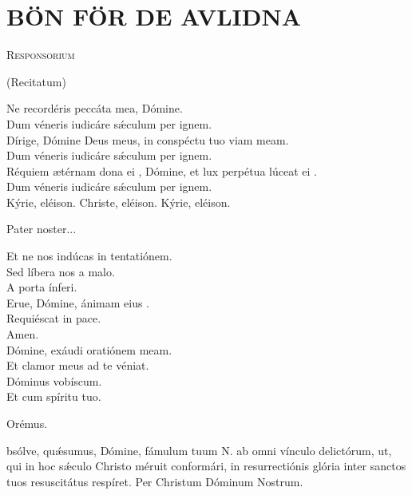 \chapter{BÖN FÖR DE AVLIDNA}
\begin{center}

\textsc{Responsorium}


{\color{rubrica}(Recitatum)}
\end{center}

\va  Ne recordéris peccáta mea, Dómine.\\
\ra Dum véneris iudicáre s\'\ae culum per ignem.\\
\va Dírige, Dómine Deus meus, in conspéctu tuo viam meam.\\
\ra Dum véneris iudicáre s\'\ae culum per ignem.\\
\va Réquiem ætérnam dona ei , Dómine, et lux perpétua lúceat ei .\\
\ra Dum véneris iudicáre s\'\ae culum per ignem.\\
Kýrie, eléison. Christe, eléison. Kýrie, eléison.
\medskip

\medskip

Pater noster...\\
\medskip

\va  Et ne nos indúcas in tentatiónem.\\
\ra Sed líbera nos a malo.\\
\va  A porta ínferi.\\
\ra Erue, Dómine, ánimam eius .\\
\va Requiéscat  in pace.\\
\ra Amen.\\
\va Dómine, exáudi oratiónem meam.\\
\ra Et clamor meus ad te véniat.\\
\va Dóminus vobíscum.\\
\ra Et cum spíritu tuo.

\newpage

Orémus.\\
\medskip

 bsólve, qu\'\ae sumus, Dómine, fámulum tuum  {\color{rubrica}N.}
ab omni vínculo delictórum, ut, qui  in hoc s\'\ae culo Christo
méruit conformári, in resurrectiónis glória inter sanc\-tos tuos
resuscitátus  respíret. Per Christum Dóminum Nostrum.
\bigskip

